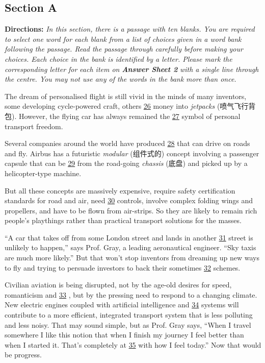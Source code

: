 \documentclass[UTF8,11pt]{ctexart}
\begin{document}
\subsection*{\textbf{Section A}}


\textbf{Directions:}\textit{ In this section, there is a passage with ten blanks. You are required to select one word for each blank} \textit{from a list of choices given in a word bank following the passage. Read the passage through carefully before} \textit{making your choices. Each choice in the bank is identified by a letter. Please mark the corresponding letter for} \textit{each item on}\textbf{\textit{ Answer Sheet 2}}\textit{ with a single line through the centre. You may not use any of the words in the bank} \textit{more than once.}


The dream of personalised flight is still vivid in the minds of many inventors, some developing cycle-powered craft, others \uline{26} money into\textit{ jetpacks} (喷气飞行背包). However, the flying car has always remained the \uline{27} symbol of personal transport freedom.


Several companies around the world have produced \uline{28} that can drive on roads and fly. Airbus has a futuristic\textit{ modular} (组件式的) concept involving a passenger capsule that can be \uline{29} from the road-going \textit{chassis} (底盘) and picked up by a helicopter-type machine.


But all these concepts are massively expensive, require safety certification standards for road and air, need \uline{30} controls, involve complex folding wings and propellers, and have to be flown from air-strips. So they are likely to remain rich people’s playthings rather than practical transport solutions for the masses.


“A car that takes off from some London street and lands in another \uline{31} street is unlikely to happen,” says Prof. Gray, a leading aeronautical engineer. “Sky taxis are much more likely.” But that won’t stop inventors from dreaming up new ways to fly and trying to persuade investors to back their sometimes \uline{32} schemes.


Civilian aviation is being disrupted, not by the age-old desires for speed, romanticism and \uline{33} , but by the pressing need to respond to a changing climate. New electric engines coupled with artificial intelligence and \uline{34} systems will contribute to a more efficient, integrated transport system that is less polluting and less noisy. That may sound simple, but as Prof. Gray says, “When I travel somewhere I like this notion that when I finish my journey I feel better than when I started it. That’s completely at \uline{35} with how I feel today.” Now that would be progress.
\end{document}
